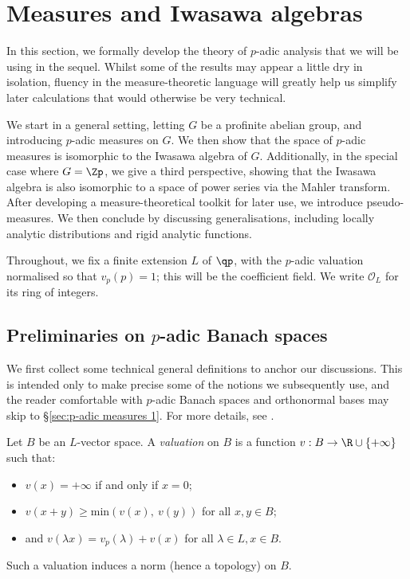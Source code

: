 \documentclass[a4paper,10pt, english, reqno]{smfart}
\numberwithin{equation}{section}
\begin{document}





\section{Measures and Iwasawa algebras}\label{sec:measures}
In this section, we formally develop the theory of $p$-adic analysis that we will be using in the sequel. Whilst some of the results may appear a little dry in isolation, fluency in the measure-theoretic language will greatly help us simplify later calculations that would otherwise be very technical.

We start in a general setting, letting $G$ be a profinite abelian group, and introducing $p$-adic measures on $G$. We then show that the space of $p$-adic measures is isomorphic to the Iwasawa algebra of $G$. Additionally, in the special case where $G = \Zp$, we give a third perspective, showing that the Iwasawa algebra is also isomorphic to a space of power series via the Mahler transform. After developing a measure-theoretical toolkit for later use, we introduce pseudo-measures. We then conclude by discussing generalisations, including locally analytic distributions and rigid analytic functions.

Throughout, we fix a finite extension $L$ of $\qp$, with the $p$-adic valuation normalised so that $v_p(p) = 1$; this will be the coefficient field. We write $\mathscr{O}_L$ for its ring of integers.



\subsection{Preliminaries on $p$-adic Banach spaces}
We first collect some technical general definitions to anchor our discussions. This is intended only to make precise some of the notions we subsequently use, and the reader comfortable with $p$-adic Banach spaces and orthonormal bases may skip to \S\ref{sec:p-adic measures 1}. For more details, see \cite[\S I.1]{Colm10}.

\begin{definition}\label{def:valuation}
Let $B$ be an $L$-vector space. A \emph{valuation} on $B$ is a function $v : B \to \R\cup\{+\infty\}$ such that:
\begin{itemize}
\item[(i)] $v(x) = +\infty$ if and only if $x = 0$; 
\item[(ii)] $v(x+y) \geq \mathrm{min}(v(x), \ v(y))$ for all $x,y \in B$; 
\item[(iii)]and $v(\lambda x) = v_p(\lambda) + v(x)$ for all $\lambda \in L, x \in B$.
\end{itemize}
Such a valuation induces a norm (hence a topology) on $B$.
\end{definition}
\end{document}
